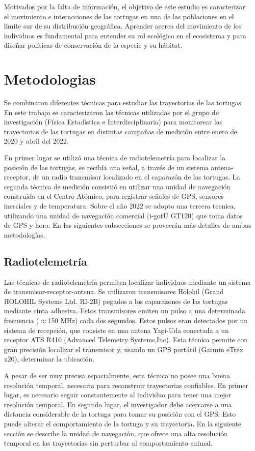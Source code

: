Motivados por la falta de información, el objetivo de este estudio es caracterizar el movimiento e interacciones de las tortugas en una de las poblaciones en el límite sur de su distribución geográfica. Aprender acerca del movimiento de los individuos es fundamental para entender su rol ecológico en el ecosistema y para diseñar políticas de conservación de la especie y su hábitat.


\section{Metodologias}

Se combinaron diferentes técnicas para estudiar las trayectorias de las tortugas. En este trabajo se caracterizaron las técnicas utilizadas por el grupo de investigación (Física Estadística e Interdisciplinaria) para monitorear las trayectorias de las tortugas en distintas campañas de medición entre enero de 2020 y abril del 2022.
 
En primer lugar se utilizó una técnica de radiotelemetría para localizar la posición de las tortugas, se recibía una señal, a través de un sistema antena-receptor, de un radio transmisor localizado en el caparazón de las tortugas. La segunda técnica de medición consistió en utilizar una unidad de navegación construída en el Centro Atómico, para registrar señales de GPS, sensores inerciales y de temperatura. Sobre el año 2022 se adopto una tercera tecnica, utilizando una unidad de navegación comercial (i-gotU GT120) que toma datos de GPS y hora. En las siguientes subsecciones se proveerán más detalles de ambas metodologías. 
 
\subsection{Radiotelemetría}
Las técnicas de radiotelemetría permiten localizar individuos mediante un sistema de transmisor-receptor-antena. Se utilizaron transmisores Holohil (Grand HOLOHIL Systems Ltd. RI-2B) pegados a los caparazones de las tortugas mediante cinta adhesiva. Estos transmisores emiten un pulso a una determinada frecuencia ($\approx$150 MHz) cada dos segundos. Estos pulsos eran detectados por un sistema de recepción, que consiste en una antena Yagi-Uda conectada a un receptor ATS R410 (Advanced Telemetry Systems,Inc). Esta técnica permite con gran precisión localizar el transmisor y, usando un GPS portátil (Garmin eTrex
x20), determinar la ubicación.
 
A pesar de ser muy precisa espacialmente, esta técnica no posee una buena resolución temporal, necesaria para reconstruir trayectorias confiables. En primer lugar, es necesario seguir constantemente al individuo para tener una mejor resolución temporal. En segundo lugar, el investigador debe acercarse a una distancia considerable de la tortuga para tomar su posición con el GPS. Esto puede alterar el comportamiento de la tortuga y su trayectoria. En la siguiente sección se describe la unidad de navegación, que ofrece una alta resolución temporal en las trayectorias sin perturbar al comportamiento animal.
 
